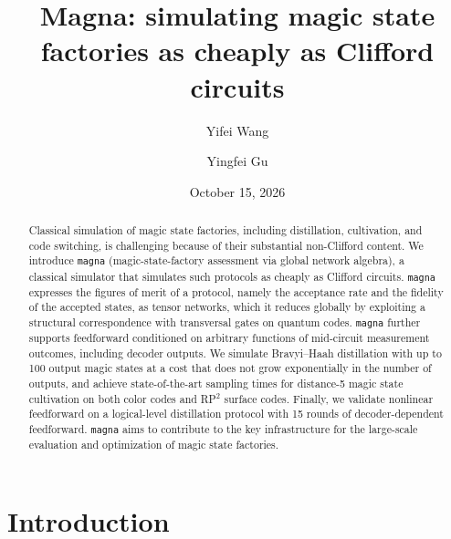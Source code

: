 \documentclass[aps,prx,twocolumn,superscriptaddress,longbibliography]{revtex4-2}
\begin{document}
\title{Magna: simulating magic state factories as cheaply as Clifford circuits}

\author{Yifei Wang}

\author{Yingfei Gu}

\date{October 15, 2026}


\begin{abstract}
Classical simulation of magic state factories, 
including distillation, cultivation, and code switching, 
is challenging because of their substantial non-Clifford content. 
We introduce \texttt{magna} (magic-state-factory assessment via global network algebra), a classical simulator 
that simulates such protocols as cheaply as Clifford circuits. 
\texttt{magna} expresses the figures of merit of a protocol, 
namely the acceptance rate and the fidelity of the accepted states, 
as tensor networks, which it reduces globally by exploiting 
a structural correspondence with transversal gates on quantum codes. 
\texttt{magna} further supports feedforward conditioned on 
arbitrary functions of mid-circuit measurement outcomes, 
including decoder outputs. 
We simulate Bravyi--Haah distillation with up to 100 output magic states 
at a cost that does not grow exponentially in the number of outputs, 
and achieve state-of-the-art sampling times for distance-5 magic state cultivation 
on both color codes and RP$^2$ surface codes. 
Finally, we validate nonlinear feedforward on a logical-level distillation protocol 
with 15 rounds of decoder-dependent feedforward.
\texttt{magna} aims to contribute to the key infrastructure 
for the large-scale evaluation and optimization of magic state factories.
\end{abstract}
\maketitle


\section{Introduction}\label{sec:intro}
\end{document}
